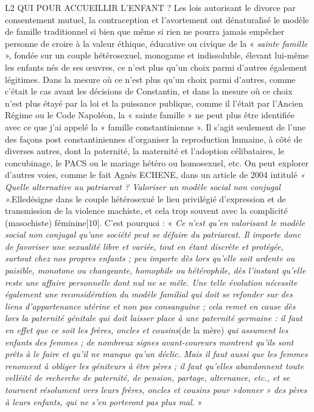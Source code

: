 L2 QUI POUR ACCUEILLIR L'ENFANT ?
 Les lois autorisant le divorce par consentement mutuel, la contraception et l'avortement ont dénaturalisé le modèle de famille traditionnel si bien que même si rien ne pourra jamais empêcher personne de croire à la valeur éthique, éducative ou civique de la « \emph{sainte famille} », fondée sur un couple hétérosexuel, monogame et indissoluble, élevant lui-même les enfants nés de ses œuvres, ce n'est plus qu'un choix parmi d'autres également légitimes. Dans la mesure où ce n'est plus qu'un choix parmi d'autres, comme c'était le cas avant les décisions de Constantin, et dans la mesure où ce choix n'est plus étayé par la loi et la puissance publique, comme il l'était par l'Ancien Régime ou le Code Napoléon, la « sainte famille » ne peut plus être identifiée avec ce que j'ai appelé la « famille constantinienne ». Il s'agit seulement de l'une des façons post constantiniennes d'organiser la reproduction humaine, à côté de diverses autres, dont la paternité, la maternité et l'adoption célibataires, le concubinage, le PACS ou le mariage hétéro ou homosexuel, etc.
 On peut explorer d'autres voies, comme le fait Agnès ECHENE, dans un article de 2004 intitulé \emph{« Quelle alternative au patriarcat ? Valoriser un modèle social non conjugal ».}Elle\emph{}désigne dans le couple hétérosexué le lieu privilégié d'expression et de transmission de la violence machiste, et cela trop souvent avec la complicité (masochiste) féminine[10]. C'est pourquoi : « \emph{Ce n'est qu'en valorisant le modèle social non conjugal qu'une société peut se défaire du patriarcat. Il importe donc de favoriser une sexualité libre et variée, tout en étant discrète et protégée, surtout chez nos propres enfants ; peu importe dès lors qu'elle soit ardente ou paisible, monotone ou changeante, homophile ou hétérophile, dès l'instant qu'elle reste une affaire personnelle dont nul ne se mêle. Une telle évolution nécessite également une reconsidération du modèle familial qui doit se refonder sur des liens d'appartenance utérine et non pas consanguine ; cela remet en cause dès lors la paternité génitale qui doit laisser place à une paternité germaine : il faut en effet que ce soit les frères, oncles et cousins}(de la mère)\emph{ qui assument les enfants des femmes ; de nombreux signes avant-coureurs montrent qu'ils sont prêts à le faire et qu'il ne manque qu'un déclic. Mais il faut aussi que les femmes renoncent à obliger les géniteurs à être pères ; il faut qu'elles abandonnent toute velléité de recherche de paternité, de pension, partage, alternance, etc., et se tournent résolument vers leurs frères, oncles et cousins pour »donner » des pères à leurs enfants, qui ne s'en porteront pas plus mal.} » 
